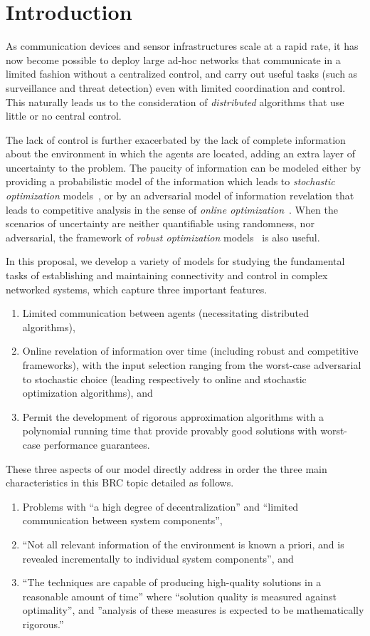\section{Introduction}
As communication devices and sensor infrastructures scale at a rapid
rate, it has now become possible to deploy large ad-hoc networks that
communicate in a limited fashion without a centralized control, and
carry out useful tasks (such as surveillance and threat detection)
even with limited coordination and control.  This naturally leads us
to the consideration of {\em distributed} algorithms that use little
or no central control.

The lack of control is further exacerbated by the lack of complete
information about the environment in which the agents are located,
adding an extra layer of uncertainty to the problem. The paucity of
information can be modeled either by providing a probabilistic model
of the information which leads to {\em stochastic optimization}
models~\cite{bl97,rs06}, or by an adversarial model of information
revelation that leads to competitive analysis in the sense of {\em
  online optimization}~\cite{be98,gkr10}. When the scenarios of
uncertainty are neither quantifiable using randomness, nor
adversarial, the framework of {\em robust optimization}
models~\cite{BEN09,dgrs05} is also useful.

In this proposal, we develop a variety of models for studying the
fundamental tasks of establishing and maintaining connectivity and
control in complex networked systems, which capture three important
features.
\begin{enumerate}
\item 
Limited communication between agents (necessitating distributed
algorithms),
\item 
Online revelation of information over time (including robust and
competitive frameworks), with the input selection ranging from the
worst-case adversarial to stochastic choice (leading respectively to
online and stochastic optimization algorithms), and
\item Permit the development of
rigorous approximation algorithms with a polynomial running time that
provide provably good solutions with worst-case performance guarantees. 
\end{enumerate}

These three aspects of our model directly address in order the three main
characteristics in this BRC topic detailed as follows.
\begin{enumerate}
\item Problems with ``a high degree of decentralization'' and
  ``limited communication between system components'',
\item ``Not all relevant information of the environment is known a
  priori, and is revealed incrementally to individual system
  components'', and
\item ``The techniques are capable of producing high-quality solutions
  in a reasonable amount of time'' where ``solution quality is
  measured against optimality'', and ''analysis of these measures is
  expected to be mathematically rigorous.''
\end{enumerate}

